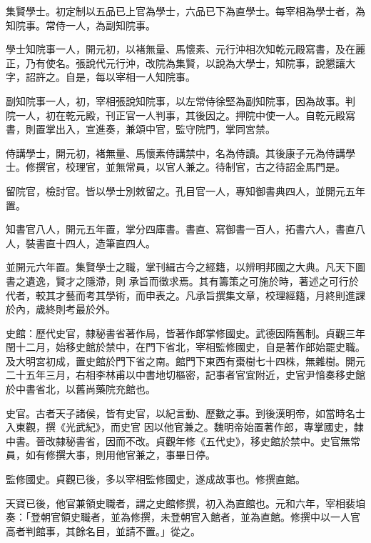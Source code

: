 \begin{pinyinscope}
 集賢學士。初定制以五品已上官為學士，六品已下為直學士。每宰相為學士者，為知院事。常侍一人，為副知院事。



 學士知院事一人，開元初，以褚無量、馬懷素、元行沖相次知乾元殿寫書，及在麗正，乃有使名。張說代元行沖，改院為集賢，以說為大學士，知院事，說懇讓大字，詔許之。自是，每以宰相一人知院事。



 副知院事一人，初，宰相張說知院事，以左常侍徐堅為副知院事，因為故事。判
 院一人，初在乾元殿，刊正官一人判事，其後因之。押院中使一人。自乾元殿寫書，則置掌出入，宣進奏，兼頌中官，監守院門，掌同宮禁。



 侍講學士，開元初，褚無量、馬懷素侍講禁中，名為侍讀。其後康子元為侍講學士。修撰官，校理官，並無常員，以官人兼之。待制官，古之待詔金馬門是。



 留院官，檢討官。皆以學士別敕留之。孔目官一人，專知御書典四人，並開元五年置。



 知書官八人，開元五年置，掌分四庫書。書直、寫御書一百人，拓書六人，書直八人，裝書直十四人，造筆直四人。



 並開元六年置。集賢學士之職，掌刊緝古今之經籍，以辨明邦國之大典。凡天下圖書之遺逸，賢才之隱滯，則
 承旨而徵求焉。其有籌策之可施於時，著述之可行於代者，較其才藝而考其學術，而申表之。凡承旨撰集文章，校理經籍，月終則進課於內，歲終則考最於外。



 史館：歷代史官，隸秘書省著作局，皆著作郎掌修國史。武德因隋舊制。貞觀三年閏十二月，始移史館於禁中，在門下省北，宰相監修國史，自是著作郎始罷史職。及大明宮初成，置史館於門下省之南。館門下東西有棗樹七十四株，無雜樹。開元二十五年三月，右相李林甫以中書地切樞密，記事者官宜附近，史官尹愔奏移史館於中書省北，以舊尚藥院充館也。



 史官。古者天子諸侯，皆有史官，以紀言動、歷數之事。到後漢明帝，如當時名士入東觀，撰《光武紀》，而史官
 因以他官兼之。魏明帝始置著作郎，專掌國史，隸中書。晉改隸秘書省，因而不改。貞觀年修《五代史》，移史館於禁中。史官無常員，如有修撰大事，則用他官兼之，事畢日停。



 監修國史。貞觀已後，多以宰相監修國史，遂成故事也。修撰直館。



 天寶已後，他官兼領史職者，謂之史館修撰，初入為直館也。元和六年，宰相裴垍奏：「登朝官領史職者，並為修撰，未登朝官入館者，並為直館。修撰中以一人官高者判館事，其餘名目，並請不置。」從之。




\end{pinyinscope}
